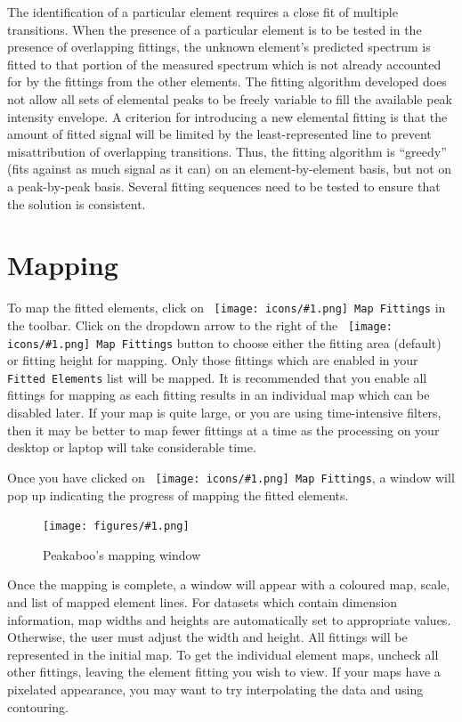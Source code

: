\documentclass[article,twoside,11pt]{report}
\newcommand{\command}[1]{\texttt{#1}}
\newcommand{\icon}[1]{\texttt{[image: icons/\#1.png]}}
\newcommand{\button}[2]{\ \command{\icon{#1} #2}}
\newcommand{\screenshot}[2]{%
\begin{figure}[h!]
\centering\texttt{[image: figures/\#1.png]}
\caption{#2}
\end{figure}
}
\newcommand{\tocchapter}[1]{\cleardoublepage\chapter*{#1}\addcontentsline{toc}{chapter}{#1}}
\begin{document}
The identification of a particular element requires a close fit of multiple transitions. 
When the presence of a particular element is to be tested in the presence of overlapping 
fittings, the unknown element’s predicted spectrum is fitted to that portion of the 
measured spectrum which is not already accounted for by the fittings from the other 
elements. The fitting algorithm developed does not allow all sets of elemental peaks to 
be freely variable to fill the available peak intensity envelope. A criterion for 
introducing a new elemental fitting is that the amount of fitted signal will be limited 
by the least-represented line to prevent misattribution of overlapping transitions. Thus, the 
fitting algorithm is ``greedy'' (fits against as much signal as it can) on an 
element-by-element basis, but not on a peak-by-peak basis. Several fitting sequences 
need to be tested to ensure that the 
solution is consistent. 


\tocchapter{Mapping}

To map the fitted elements, click on \button{map}{Map Fittings} in the toolbar. 
Click on the dropdown arrow to the right of the \button{map}{Map Fittings} button to 
choose either the fitting area (default) or fitting height for mapping. Only those 
fittings which are enabled in your \command{Fitted Elements} list will be mapped. It 
is recommended that you enable all fittings for mapping as each fitting results in 
an individual map which can be disabled later. If your map is quite large, or you 
are using time-intensive filters, then it may be better to map fewer fittings at a 
time as the processing on your desktop or laptop will take considerable time.

Once you have clicked on \button{map}{Map Fittings}, a window will pop up indicating the
progress of mapping the fitted elements.

\screenshot{map-window}{Peakaboo's mapping window}

Once the mapping is complete, a window will appear with a coloured map, scale, and 
list of mapped element lines. For datasets which contain dimension information, map 
widths and heights are automatically set to appropriate values. Otherwise, the user 
must adjust the width and height. All fittings will be represented in the initial map. 
To get the individual element maps, uncheck all other fittings, leaving the element 
fitting you wish to view. If your maps have a pixelated appearance, you may want to 
try interpolating the data and using contouring.
\end{document}
